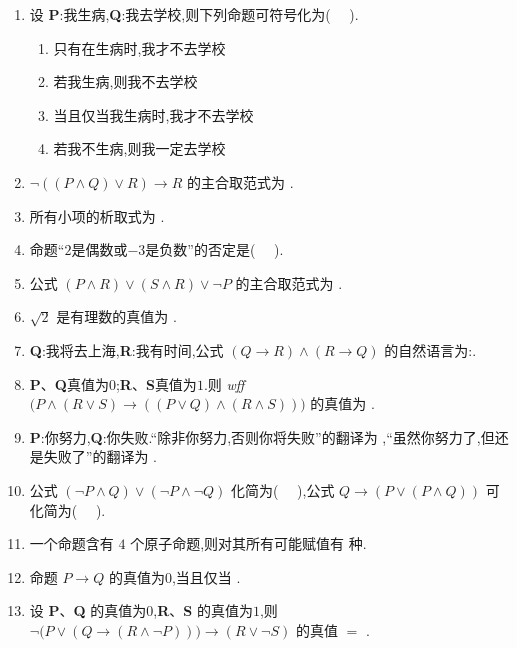 \begin{enumerate}
	\item 设 \textbf{P}:我生病,\textbf{Q}:我去学校,则下列命题可符号化为( \ \ ).
	
	\begin{enumerate}
		\item[(1)] 只有在生病时,我才不去学校
		\item[(2)] 若我生病,则我不去学校
		\item[(3)] 当且仅当我生病时,我才不去学校
		\item[(4)] 若我不生病,则我一定去学校
	\end{enumerate}
	
	\item $\neg((P\land Q)\lor R)\to R$ 的主合取范式为 \underline{\hspace{8em}}.
	
	\item 所有小项的析取式为 \underline{\hspace{8em}}.
	
	\item 命题“$2$是偶数或$-3$是负数”的否定是( \ \ ).
	
	\item 公式 $(P\land R)\lor(S\land R)\lor\neg P$ 的主合取范式为 \underline{\hspace{8em}}.
	
	\item $\sqrt{2}$ 是有理数的真值为 \underline{\hspace{6em}}.
	
	\item \textbf{Q}:我将去上海,\textbf{R}:我有时间,公式 $(Q\to R)\land(R\to Q)$ 的自然语言为:\underline{\hspace{4em}}.
	
	\item \textbf{P}、\textbf{Q}真值为$0$;\textbf{R}、\textbf{S}真值为$1$.则 \textit{wff} $ \bigl(P\land(R\lor S)\to((P\lor Q)\land(R\land S))\bigr)$ 的真值为 \underline{\hspace{10em}}.
	
	\item \textbf{P}:你努力,\textbf{Q}:你失败.“除非你努力,否则你将失败”的翻译为 \underline{\hspace{3em}},“虽然你努力了,但还是失败了”的翻译为 \underline{\hspace{8em}}.
	
	\item 公式 $(\neg P\land Q)\lor(\neg P\land \neg Q)$ 化简为( \ \ ),公式 $Q\to(P\lor(P\land Q))$ 可化简为( \ \ ).
	
	\item 一个命题含有 $4$ 个原子命题,则对其所有可能赋值有 \underline{\hspace{6em}} 种.
	
	\item 命题 $P\to Q$ 的真值为$0$,当且仅当 \underline{\hspace{8em}}.
	
	\item 设 \textbf{P}、\textbf{Q} 的真值为$0$,\textbf{R}、\textbf{S} 的真值为$1$,则 $\neg\bigl(P\lor(Q\to(R\land \neg P))\bigr)\to(R\lor \neg S)$ 的真值 $=$ \underline{\hspace{8em}}.
\end{enumerate}



